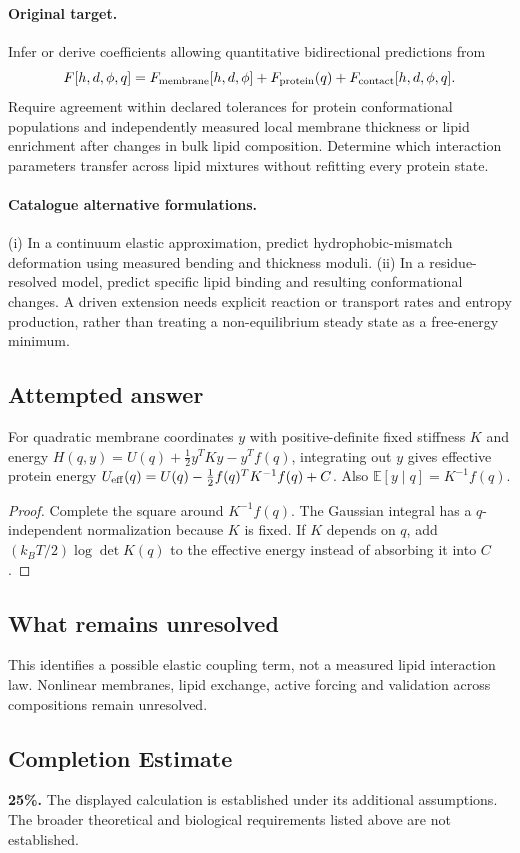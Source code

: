 \documentclass[11pt]{article}
\begin{document}
\paragraph{Original target.}
Infer or derive coefficients allowing quantitative bidirectional predictions from
\[F[h,d,\phi,q]=F_{\rm membrane}[h,d,\phi]+F_{\rm protein}(q)+F_{\rm contact}[h,d,\phi,q].\]
Require agreement within declared tolerances for protein conformational populations and independently measured local membrane thickness or lipid enrichment after changes in bulk lipid composition. Determine which interaction parameters transfer across lipid mixtures without refitting every protein state.
\paragraph{Catalogue alternative formulations.}
(i) In a continuum elastic approximation, predict hydrophobic-mismatch deformation using measured bending and thickness moduli. (ii) In a residue-resolved model, predict specific lipid binding and resulting conformational changes. A driven extension needs explicit reaction or transport rates and entropy production, rather than treating a non-equilibrium steady state as a free-energy minimum.
\subsection{Attempted answer}
\begin{proposition}
For quadratic membrane coordinates $y$ with positive-definite fixed stiffness $K$ and energy $H(q,y)=U(q)+\tfrac12y^TKy-y^Tf(q)$, integrating out $y$ gives effective protein energy $U_{\rm eff}(q)=U(q)-\tfrac12f(q)^TK^{-1}f(q)+C$. Also $\mathbb{E}[y\mid q]=K^{-1}f(q)$.
\end{proposition}
\begin{proof}
Complete the square around $K^{-1}f(q)$. The Gaussian integral has a $q$-independent normalization because $K$ is fixed. If $K$ depends on $q$, add $(k_BT/2)\log\det K(q)$ to the effective energy instead of absorbing it into $C$.
\end{proof}
\subsection{What remains unresolved}
This identifies a possible elastic coupling term, not a measured lipid interaction law. Nonlinear membranes, lipid exchange, active forcing and validation across compositions remain unresolved.
\subsection{Completion Estimate}
\textbf{25\%.} The displayed calculation is established under its additional assumptions. The broader theoretical and biological requirements listed above are not established.
\end{document}
